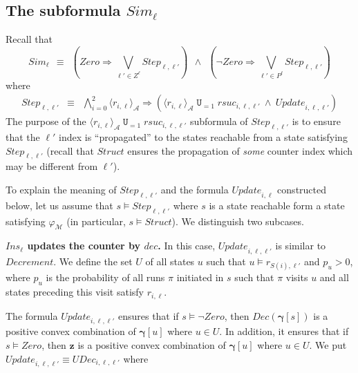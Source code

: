 \documentclass[a4paper,UKenglish,cleveref, autoref, thm-restate]{lipics-v2021}
\newcommand{\A}{\mathcal{A}}
\newcommand{\M}{\mathcal{M}}
\newcommand{\ex}[1]{\langle #1 \rangle}
\newcommand{\Simulate}{\mathit{Sim}}
\newcommand{\Step}{\mathit{Step}}
\newcommand{\Zero}{\mathit{Zero}}
\newcommand{\Ins}{\mathit{Ins}}
\newcommand{\DEC}{\mathit{Dec}}
\renewcommand{\vec}[1]{\pmb{#1}}
\newcommand{\Struct}{\textit{Struct}}
\newcommand{\Decrement}{\textit{Decrement}}
\newcommand{\rSuc}{\textit{rsuc}}
\newcommand{\Update}{\textit{Update}}
\newcommand{\Dec}{\textit{dec}}
\newcommand{\UDec}{\textit{UDec}}
\newcommand{\cv}{\vec{\gamma}}
\newcommand*{\opu}{\operatorname{\pmb{\mathtt{U}}}}
\renewcommand{\paragraph}[1]{\medskip

\noindent\textbf{#1.}\quad }
\begin{document}
\subsection{The subformula $\Simulate_\ell$}
\label{app-sim-subformula}
Recall that
\begin{equation*}\textstyle
    \Simulate_\ell ~~\equiv~~ (\Zero \Rightarrow \bigvee_{\ell' \in Z^\ell} \Step_{\ell,\ell'}) ~~\wedge~~
    (\neg\Zero \Rightarrow \bigvee_{\ell' \in P^\ell} \Step_{\ell,\ell'}) 
\end{equation*}
where
\begin{eqnarray*}
    \Step_{\ell,\ell'} & \equiv & \bigwedge_{i=0}^2 \ex{r_{i,\ell}}_{\A} \Rightarrow  \left( \ex{r_{i,\ell}}_{\A} \opu_{=1} \rSuc_{i,\ell,\ell'} 
    \ \wedge\ \Update_{i,\ell,\ell'} \right)
\end{eqnarray*}
The purpose of the $\ex{r_{i,\ell}}_{\A} \opu_{=1} \rSuc_{i,\ell,\ell'}$ subformula of $\Step_{\ell,\ell'}$ is to ensure that the $\ell'$ index is ``propagated'' to the states reachable from a state satisfying $\Step_{\ell,\ell'}$ (recall that $\Struct$ ensures the propagation of \emph{some} counter index which may be different from $\ell'$).

To explain the meaning of $\Step_{\ell,\ell'}$ and the formula $\Update_{i,\ell}$ constructed below, let us assume that $s \models \Step_{\ell,\ell'}$ where $s$ is a state reachable form a state satisfying $\varphi_\M$ (in particular, $s \models \Struct$). We distinguish two subcases.



\paragraph{$\pmb{\Ins_\ell}$ updates the counter by $\Dec$}
In this case,  $\Update_{i,\ell,\ell'}$ is similar to $\Decrement$. 
We define the set $U$ of all states $u$ such that $u \models r_{S(i),\ell'}$ and $p_u > 0$, where $p_u$ is the probability of all runs $\pi$ initiated in $s$ such that $\pi$ visits $u$ and all states preceding this visit satisfy $r_{i,\ell}$. 

The formula $\Update_{i,\ell,\ell'}$ ensures that if $s \models \neg\Zero$, then $\DEC(\cv[s])$ is a positive convex combination of $\cv[u]$ where $u \in U$. In addition, it
ensures that if $s \models \Zero$, then $\vec{z}$ is a positive convex combination of $\cv[u]$ where $u \in U$. We put $\Update_{i,\ell,\ell'} \equiv \UDec_{i,\ell,\ell'}$ where
\end{document}
